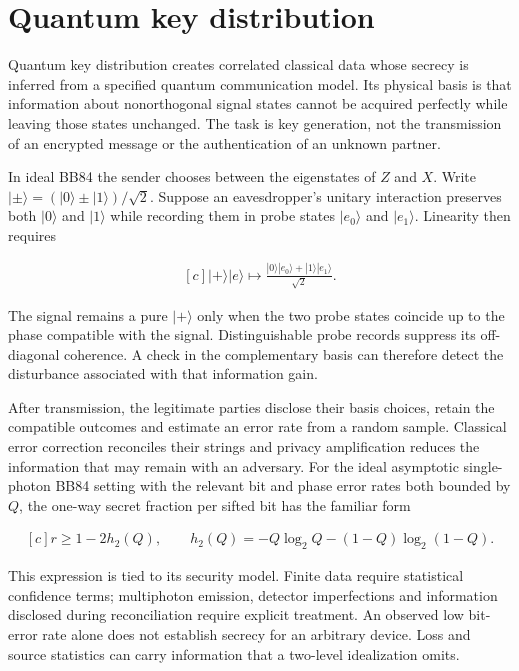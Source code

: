 \documentclass[11pt,oneside]{book}
\newenvironment{centeredalign}{\[\begin{gathered}[c]}{\end{gathered}\]}
\begin{document}
\clearpage

\section{Quantum key distribution}

\label{topic:quantum-key-distribution}

Quantum key distribution creates correlated classical data whose secrecy is inferred from a specified quantum communication model. Its physical basis is that information about nonorthogonal signal states cannot be acquired perfectly while leaving those states unchanged. The task is key generation, not the transmission of an encrypted message or the authentication of an unknown partner.

In ideal BB84 the sender chooses between the eigenstates of \(Z\) and \(X\). Write \(|\pm\rangle=(|0\rangle\pm|1\rangle)/\sqrt2\). Suppose an eavesdropper's unitary interaction preserves both \(|0\rangle\) and \(|1\rangle\) while recording them in probe states \(|e_0\rangle\) and \(|e_1\rangle\). Linearity then requires

\begin{centeredalign}
|+\rangle|e\rangle\longmapsto
\frac{|0\rangle|e_0\rangle+|1\rangle|e_1\rangle}{\sqrt2}.
\end{centeredalign}

The signal remains a pure \(|+\rangle\) only when the two probe states coincide up to the phase compatible with the signal. Distinguishable probe records suppress its off-diagonal coherence. A check in the complementary basis can therefore detect the disturbance associated with that information gain.

After transmission, the legitimate parties disclose their basis choices, retain the compatible outcomes and estimate an error rate from a random sample. Classical error correction reconciles their strings and privacy amplification reduces the information that may remain with an adversary. For the ideal asymptotic single-photon BB84 setting with the relevant bit and phase error rates both bounded by \(Q\), the one-way secret fraction per sifted bit has the familiar form

\begin{centeredalign}
r\geq1-2h_2(Q),\qquad
h_2(Q)=-Q\log_2Q-(1-Q)\log_2(1-Q).
\end{centeredalign}

This expression is tied to its security model. Finite data require statistical confidence terms; multiphoton emission, detector imperfections and information disclosed during reconciliation require explicit treatment. An observed low bit-error rate alone does not establish secrecy for an arbitrary device. Loss and source statistics can carry information that a two-level idealization omits.
\end{document}
